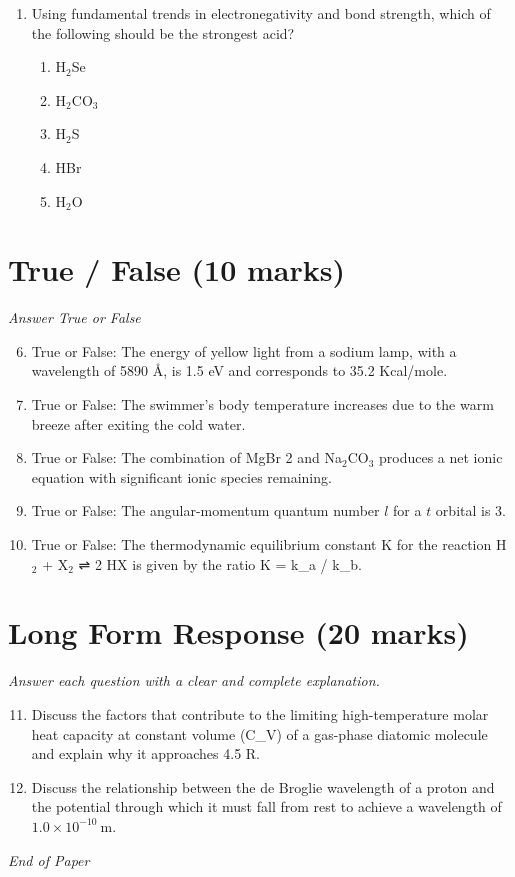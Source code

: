 \documentclass[12pt]{article}
\begin{document}
\begin{enumerate}[label=\arabic*.]
\begin{enumerate}[label=(\alph*)]
    \item often very reactive with water
\end{enumerate}
\item Using fundamental trends in electronegativity and bond strength, which of the following should be the strongest acid?
\begin{enumerate}[label=(\alph*)]
    \item H$_{2}$Se
    \item H$_{2}$CO$_{3}$
    \item H$_{2}$S
    \item HBr
    \item H$_{2}$O
\end{enumerate}
\end{enumerate}

\section*{True / False (10 marks)}
\textit{Answer True or False}
\begin{enumerate}[label=\arabic*.]
\setcounter{enumi}{5}
\item True or False: The energy of yellow light from a sodium lamp, with a wavelength of 5890 Å, is 1.5 eV and corresponds to 35.2 Kcal/mole.
\item True or False: The swimmer's body temperature increases due to the warm breeze after exiting the cold water.
\item True or False: The combination of MgBr 2 and Na$_{2}$CO$_{3}$ produces a net ionic equation with significant ionic species remaining.
\item True or False: The angular-momentum quantum number $l$ for a $t$ orbital is 3.
\item True or False: The thermodynamic equilibrium constant K for the reaction H$_{2}$ + X$_{2}$ ⇌ 2 HX is given by the ratio K = k\_a / k\_b.
\end{enumerate}

\section*{Long Form Response (20 marks)}
\textit{Answer each question with a clear and complete explanation.}
\begin{enumerate}[label=\arabic*.]
\setcounter{enumi}{10}
\item Discuss the factors that contribute to the limiting high-temperature molar heat capacity at constant volume (C\_V) of a gas-phase diatomic molecule and explain why it approaches 4.5 R.
\item Discuss the relationship between the de Broglie wavelength of a proton and the potential through which it must fall from rest to achieve a wavelength of $1.0 \times 10^{-10} \mathrm{~m}$.
\end{enumerate}

\vfill
\noindent\textit{End of Paper}
\end{document}
